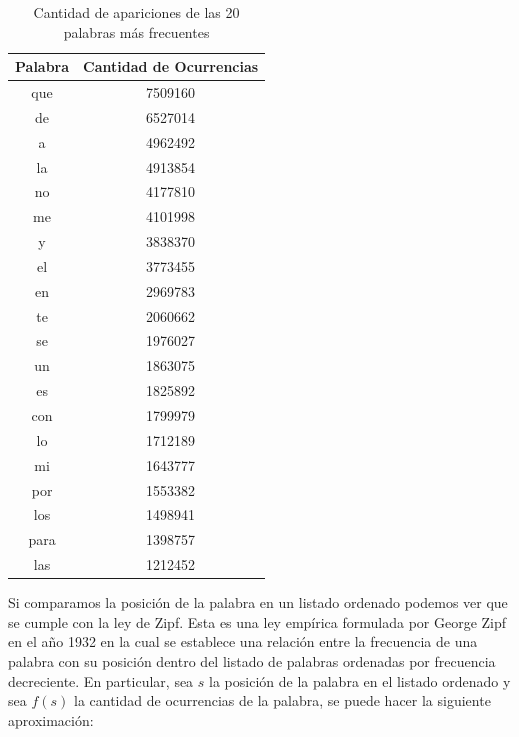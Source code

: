 \begin{table}[ht]
\centering
\label{tab:palabrasMasOcurrentes}
\begin{tabular}{|c|c|}
\hline
Palabra & Cantidad de Ocurrencias \\ \hline
que     & 7509160                 \\
de      & 6527014                 \\
a       & 4962492                 \\
la      & 4913854                 \\
no      & 4177810                 \\
me      & 4101998                 \\
y       & 3838370                 \\
el      & 3773455                 \\
en      & 2969783                 \\
te      & 2060662                 \\
se      & 1976027                 \\
un      & 1863075                 \\
es      & 1825892                 \\
con     & 1799979                 \\
lo      & 1712189                 \\
mi      & 1643777                 \\
por     & 1553382                 \\
los     & 1498941                 \\
para    & 1398757                 \\
las     & 1212452                 \\
\hline
\end{tabular}
\caption{Cantidad de apariciones de las 20 palabras más frecuentes}

\end{table}

Si comparamos la posición de la palabra en un listado ordenado podemos ver que se cumple con la ley de Zipf. Esta es una ley empírica formulada por George Zipf en el año 1932 en la cual se establece una relación entre la frecuencia de una palabra con su posición dentro del listado de palabras ordenadas por frecuencia decreciente. En particular, sea $s$ la posición de la palabra en el listado ordenado y sea $f(s)$ la cantidad de ocurrencias de la palabra, se puede hacer la siguiente aproximación:

